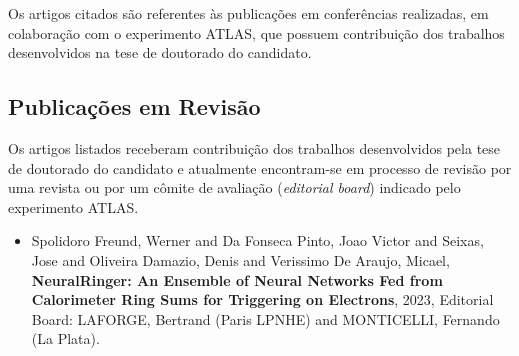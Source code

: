 Os artigos citados são referentes às publicações em conferências realizadas, em colaboração com o experimento ATLAS, que possuem contribuição dos trabalhos desenvolvidos na tese de doutorado do candidato.




\subsection{Publicações em Revisão}

Os artigos listados receberam contribuição dos trabalhos desenvolvidos pela tese de doutorado do candidato e atualmente encontram-se em processo de revisão por uma revista ou por um cômite de avaliação (\emph{editorial board}) indicado pelo experimento ATLAS. 

\begin{itemize}
    \item Spolidoro Freund, Werner and Da Fonseca Pinto, Joao Victor and Seixas, Jose and Oliveira Damazio, Denis and Verissimo De Araujo, Micael, \textbf{NeuralRinger: An Ensemble of Neural Networks Fed from Calorimeter Ring Sums for Triggering on Electrons}, 2023, Editorial Board: LAFORGE, Bertrand (Paris LPNHE) and MONTICELLI, Fernando (La Plata).
\end{itemize}



